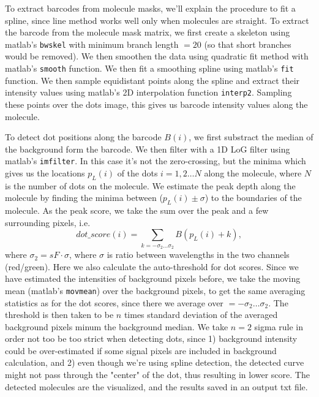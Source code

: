 \documentclass{article}
\begin{document}
To extract barcodes from molecule masks, we'll explain the procedure to fit a spline,  since line method works well only when molecules are straight. To extract the barcode from the molecule mask matrix, we first create a skeleton using matlab's \texttt{bwskel} with minimum branch length $=20$ (so that short branches would be removed). We then smoothen the data using quadratic fit method with matlab's \texttt{smooth} function. We then fit a smoothing spline using matlab's \texttt{fit} function. We then sample equidistant points along the spline and extract their intensity values using matlab's 2D interpolation function \texttt{interp2}. Sampling these points over the dots image, this gives us barcode intensity values along the molecule.

To detect dot positions along the barcode $B(i)$, we first substract the median of the background form the barcode. We then filter with a 1D LoG filter using matlab's \texttt{imfilter}. In this case it's not the zero-crossing, but the minima which gives us the locations $p_L(i)$ of the dots $i=1,2\ldots N$ along the molecule, where $N$ is the number of dots on the molecule. We estimate the peak depth along the molecule by finding the minima between ($p_L(i) \pm \sigma$) to the boundaries of the molecule. As the peak score, we take the sum over the peak and a few surrounding pixels, i.e. 
%
\begin{equation}
	dot\_score(i) = \sum_{k=-\sigma_2\ldots \sigma_2}  B(p_L(i)+k),
\end{equation}
 where $\sigma_2 = sF\cdot \sigma$, where $\sigma$ is ratio between wavelengths in the two channels (red/green).
%
Here we also calculate the auto-threshold for dot scores. Since we have estimated the intensities of background pixels before, we take the moving mean (matlab's \texttt{movmean}) over the background pixels, to get the same averaging statistics as for the dot scores, since there we average over $=-\sigma_2\ldots \sigma_2$. The threshold is then taken to be $n$ times standard deviation of the averaged background pixels minum the background median. We take $n=2$ sigma rule in order not too be too strict when detecting dots, since 1) background intensity could be over-estimated if some signal pixels are included in background calculation, and 2) even though we're using spline detection, the detected curve might not pass through the "center" of the dot, thus resulting in lower score. The detected molecules are the visualized, and the results saved in an output txt file.
\end{document}
